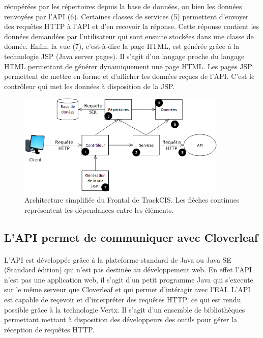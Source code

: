 			récupérées par les répertoires depuis la base de données, ou bien les
			données renvoyées par l'API (6). Certaines classes de services (5)
			permettent d'envoyer des requêtes HTTP à l'API et d'en recevoir la réponse.
			Cette réponse contient les données demandées par l'utilisateur qui sont
			ensuite stockées dans une classe de donnée. Enfin, la vue (7), c'est-à-dire
			la page HTML, est générée grâce à la technologie JSP (Java server pages). Il
			s'agit d'un langage proche du langage HTML permettant de générer
			dynamiquement une page HTML.
			Les pages JSP permettent de mettre en forme et d'afficher les données reçues
			de l'API. C'est le contrôleur qui met les données à disposition de la JSP.
			\begin{figure}[H]
				\centering
				\includegraphics[width=10cm]{../img/part3/archi_actuelle_front.png}
				\caption{\label{archi_actuelle_front} Architecture simplifiée du Frontal
				de TrackCIS. Les flèches continues représentent les dépendances entre les
				éléments.}
			\end{figure}
			
		\subsection{L'API permet de communiquer avec Cloverleaf}
			\paragraph{}%
			L'API est développée grâce à la plateforme standard de Java ou Java SE
			(Standard édition) qui n'est pas destinée au développement web. En effet
			l'API n'est pas une application web, il s'agit d'un petit programme Java qui
			s'execute sur le même serveur que Cloverleaf et qui permet d'intéragir avec
			l'EAI. L'API est capable de reçevoir et d'interpréter des requêtes
			HTTP, ce qui est rendu possible grâce à la technologie Vertx. Il s'agit
			d'un ensemble de bibliothèques permettant mettant à disposition des
			développeurs des outils pour gérer la réception de requêtes HTTP.
			
